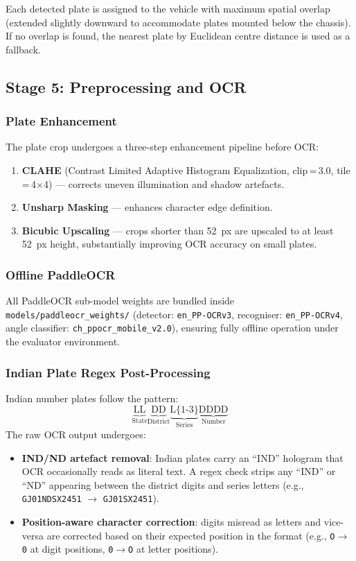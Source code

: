 \documentclass[12pt,a4paper]{article}
\begin{document}
Each detected plate is assigned to the vehicle with maximum spatial overlap (extended
slightly downward to accommodate plates mounted below the chassis). If no overlap is
found, the nearest plate by Euclidean centre distance is used as a fallback.

\subsection{Stage 5: Preprocessing and OCR}

\subsubsection{Plate Enhancement}
The plate crop undergoes a three-step enhancement pipeline before OCR:
\begin{enumerate}[label=\alph*.]
  \item \textbf{CLAHE} (Contrast Limited Adaptive Histogram Equalization, clip\,=\,3.0,
        tile\,=\,4$\times$4) — corrects uneven illumination and shadow artefacts.
  \item \textbf{Unsharp Masking} — enhances character edge definition.
  \item \textbf{Bicubic Upscaling} — crops shorter than 52~px are upscaled to at least
        52~px height, substantially improving OCR accuracy on small plates.
\end{enumerate}

\subsubsection{Offline PaddleOCR}
All PaddleOCR sub-model weights are bundled inside \texttt{models/paddleocr\_weights/}
(detector: \texttt{en\_PP-OCRv3}, recogniser: \texttt{en\_PP-OCRv4}, angle classifier:
\texttt{ch\_ppocr\_mobile\_v2.0}), ensuring fully offline operation under the evaluator
environment.

\subsubsection{Indian Plate Regex Post-Processing}
Indian number plates follow the pattern:
\[
  \underbrace{\text{LL}}_{\text{State}} \underbrace{\text{DD}}_{\text{District}}
  \underbrace{\text{L\{1-3\}}}_{\text{Series}} \underbrace{\text{DDDD}}_{\text{Number}}
\]
The raw OCR output undergoes:
\begin{itemize}
  \item \textbf{IND/ND artefact removal}: Indian plates carry an ``IND'' hologram that
        OCR occasionally reads as literal text. A regex check strips any ``IND'' or ``ND''
        appearing between the district digits and series letters
        (e.g., \texttt{GJ01NDSX2451} $\to$ \texttt{GJ01SX2451}).
  \item \textbf{Position-aware character correction}: digits misread as letters and
        vice-versa are corrected based on their expected position in the format (e.g.,
        \texttt{O$\to$0} at digit positions, \texttt{0$\to$O} at letter positions).
\end{itemize}
\end{document}
